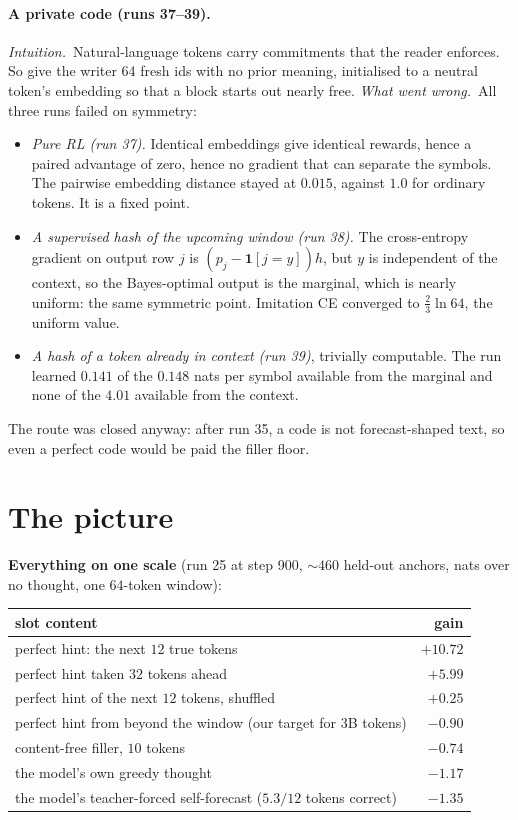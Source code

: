 \documentclass[11pt]{article}
\newcommand{\why}{\emph{Intuition.}\ }
\newcommand{\fail}{\emph{What went wrong.}\ }
\begin{document}
\paragraph{A private code (runs 37--39).}
\why Natural-language tokens carry commitments that the reader enforces. So give the writer 64 fresh ids with no prior meaning, initialised to a neutral token's embedding so that a block starts out nearly free.
\fail All three runs failed on symmetry:
\begin{itemize}\setlength{\itemsep}{1pt}
\item \emph{Pure RL (run 37).} Identical embeddings give identical rewards, hence a paired advantage of zero, hence no gradient that can separate the symbols. The pairwise embedding distance stayed at $0.015$, against $1.0$ for ordinary tokens. It is a fixed point.
\item \emph{A supervised hash of the upcoming window (run 38).} The cross-entropy gradient on output row $j$ is $(p_j-\mathbf{1}[j=y])h$, but $y$ is independent of the context, so the Bayes-optimal output is the marginal, which is nearly uniform: the same symmetric point. Imitation CE converged to $\tfrac23\ln64$, the uniform value.
\item \emph{A hash of a token already in context (run 39)}, trivially computable. The run learned $0.141$ of the $0.148$ nats per symbol available from the marginal and none of the $4.01$ available from the context.
\end{itemize}
The route was closed anyway: after run 35, a code is not forecast-shaped text, so even a perfect code would be paid the filler floor.

\section{The picture}

\textbf{Everything on one scale} (run 25 at step 900, ${\sim}460$ held-out anchors, nats over no thought, one $64$-token window):
\begin{center}\small
\begin{tabular}{lr}
\toprule
slot content & gain\\
\midrule
perfect hint: the next $12$ true tokens & $+10.72$\\
perfect hint taken $32$ tokens ahead & $+5.99$\\
perfect hint of the next $12$ tokens, shuffled & $+0.25$\\
perfect hint from beyond the window (our target for 3B tokens) & $-0.90$\\
content-free filler, $10$ tokens & $-0.74$\\
the model's own greedy thought & $-1.17$\\
the model's teacher-forced self-forecast ($5.3/12$ tokens correct) & $-1.35$\\
\bottomrule
\end{tabular}
\end{center}
\end{document}
